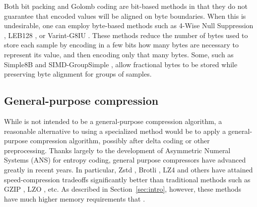 Both bit packing and Golomb coding are bit-based methods in that they do not guarantee that encoded values will be aligned on byte boundaries. When this is undesirable, one can employ byte-based methods such as 4-Wise Null Suppression \cite{kGamma}, LEB128 \cite{dwarf}, or Varint-G8IU \cite{varintG8IU}. These methods reduce the number of bytes used to store each sample by encoding in a few bits how many bytes are necessary to represent its value, and then encoding only that many bytes. Some, such as Simple8B \cite{simple8b} and SIMD-GroupSimple \cite{groupSimd}, allow fractional bytes to be stored while preserving byte alignment for groups of samples. %


\subsection{General-purpose compression}
While \minesp is not intended to be a general-purpose compression algorithm, a reasonable alternative to using a specialized method would be to apply a general-purpose compression algorithm, possibly after delta coding or other preprocessing. Thanks largely to the development of Asymmetric Numeral Systems (ANS) \cite{ans} for entropy coding, general purpose compressors have advanced greatly in recent years. In particular, Zstd \cite{zstd}, Brotli \cite{brotli}, LZ4 \cite{lz4} and others have attained speed-compression tradeoffs significantly better than traditional methods such as GZIP \cite{gzip}, LZO \cite{lzo}, etc. As described in Section~\ref{sec:intro}, however, these methods have much higher memory requirements that \mine.


